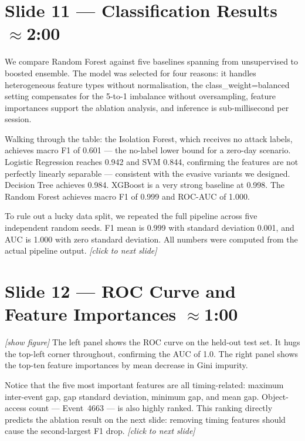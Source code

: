 \documentclass[14pt]{article}
\begin{document}
\section*{Slide 11 — Classification Results \hfill \normalfont\small $\approx$2:00}

We compare Random Forest against five baselines spanning from unsupervised to boosted ensemble. The model was selected for four reasons: it handles heterogeneous feature types without normalisation, the class\_weight=balanced setting compensates for the 5-to-1 imbalance without oversampling, feature importances support the ablation analysis, and inference is sub-millisecond per session.

Walking through the table: the Isolation Forest, which receives no attack labels, achieves macro F1 of 0.601 --- the no-label lower bound for a zero-day scenario. Logistic Regression reaches 0.942 and SVM 0.844, confirming the features are not perfectly linearly separable --- consistent with the evasive variants we designed. Decision Tree achieves 0.984. XGBoost is a very strong baseline at 0.998. The Random Forest achieves macro F1 of 0.999 and ROC-AUC of 1.000.

To rule out a lucky data split, we repeated the full pipeline across five independent random seeds. F1 mean is 0.999 with standard deviation 0.001, and AUC is 1.000 with zero standard deviation. All numbers were computed from the actual pipeline output. \textit{[click to next slide]}

\section*{Slide 12 — ROC Curve and Feature Importances \hfill \normalfont\small $\approx$1:00}

\textit{[show figure]} The left panel shows the ROC curve on the held-out test set. It hugs the top-left corner throughout, confirming the AUC of 1.0. The right panel shows the top-ten feature importances by mean decrease in Gini impurity.

Notice that the five most important features are all timing-related: maximum inter-event gap, gap standard deviation, minimum gap, and mean gap. Object-access count --- Event~4663 --- is also highly ranked. This ranking directly predicts the ablation result on the next slide: removing timing features should cause the second-largest F1 drop. \textit{[click to next slide]}
\end{document}
